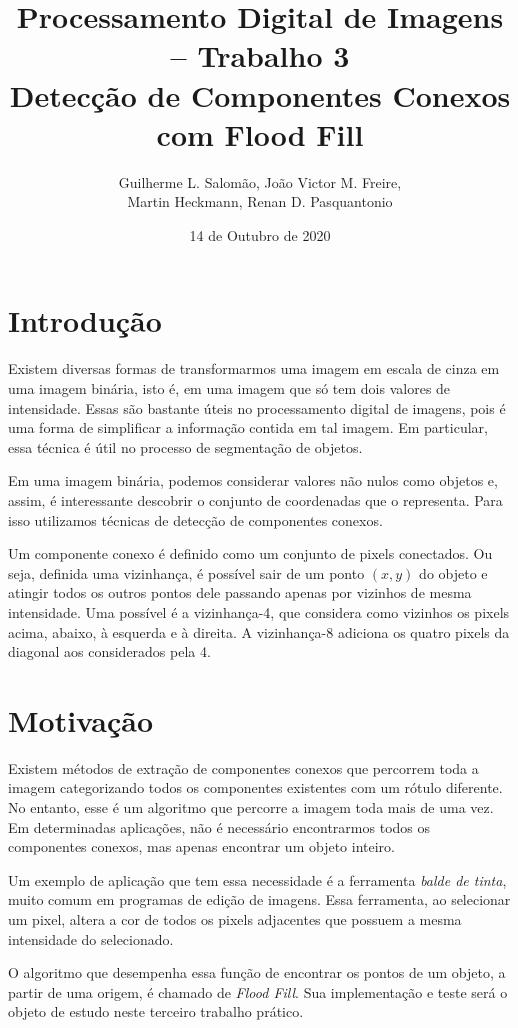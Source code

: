 \documentclass[12pt,a4paper]{article}
\title{Processamento Digital de Imagens – Trabalho 3\\Detecção de Componentes Conexos com Flood Fill}
\author{Guilherme L. Salomão, João Victor M. Freire, \\Martin Heckmann, Renan D. Pasquantonio }
\date{14 de Outubro de 2020}
\begin{document}
\maketitle

\section{Introdução}
Existem diversas formas de transformarmos uma imagem em escala de cinza em uma imagem binária, isto é, em uma imagem que só tem dois valores de intensidade. Essas são bastante úteis no processamento digital de imagens, pois é uma forma de simplificar a informação contida em tal imagem. Em particular, essa técnica é útil no processo de segmentação de objetos.

Em uma imagem binária, podemos considerar valores não nulos como objetos e, assim, é interessante descobrir o conjunto de coordenadas que o representa. Para isso utilizamos técnicas de detecção de componentes conexos.

Um componente conexo é definido como um conjunto de pixels conectados. Ou seja, definida uma vizinhança, é possível sair de um ponto $(x, y)$ do objeto e atingir todos os outros pontos dele passando apenas por vizinhos de mesma intensidade. Uma possível é a vizinhança-4, que considera como vizinhos os pixels acima, abaixo, à esquerda e à direita. A vizinhança-8 adiciona os quatro pixels da diagonal aos considerados pela 4.

\section{Motivação}

Existem métodos de extração de componentes conexos que percorrem toda a imagem categorizando todos os componentes existentes com um rótulo diferente. No entanto, esse é um algoritmo que percorre a imagem toda mais de uma vez. Em determinadas aplicações, não é necessário encontrarmos todos os componentes conexos, mas apenas encontrar um objeto inteiro.

Um exemplo de aplicação que tem essa necessidade é a ferramenta \textit{balde de tinta}, muito comum em programas de edição de imagens. Essa ferramenta, ao selecionar um pixel, altera a cor de todos os pixels adjacentes que possuem a mesma intensidade do selecionado.

O algoritmo que desempenha essa função de encontrar os pontos de um objeto, a partir de uma origem, é chamado de \textit{Flood Fill}. Sua implementação e teste será o objeto de estudo neste terceiro trabalho prático.
\end{document}

